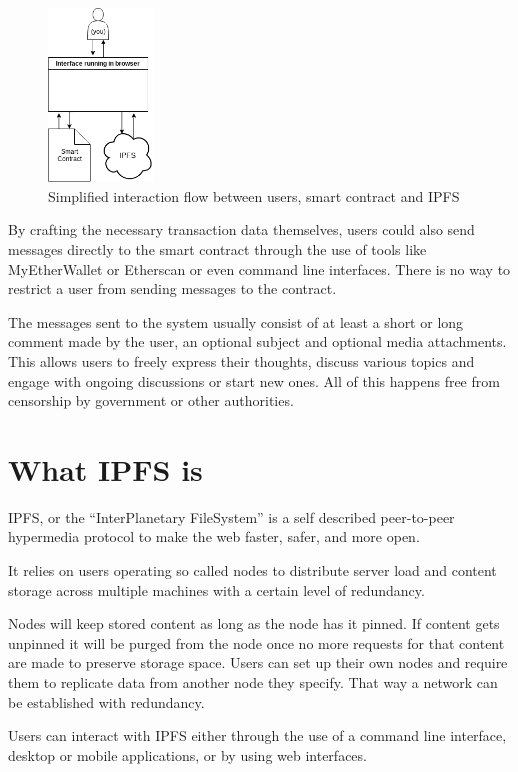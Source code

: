 \documentclass[a4paper]{article}
\begin{document}
\begin{figure}[H]
  \centering
  \includegraphics[width=0.25\textwidth]{0x_flow.png}
  \caption{Simplified interaction flow between users, smart contract and IPFS}
  \label{fig:flow}
\end{figure}

By crafting the necessary transaction data themselves, users could also send messages directly to the smart contract through the use of tools like MyEtherWallet or Etherscan or even command line interfaces. There is no way to restrict a user from sending messages to the contract.

The messages sent to the system usually consist of at least a short or long comment made by the user, an optional subject and optional media attachments. This allows users to freely express their thoughts, discuss various topics and engage with ongoing discussions or start new ones. All of this happens free from censorship by government or other authorities.

\section{What IPFS is}
IPFS, or the ``InterPlanetary FileSystem'' is a self described peer-to-peer hypermedia protocol to make the web faster, safer, and more open.

It relies on users operating so called nodes to distribute server load and content storage across multiple machines with a certain level of redundancy.

Nodes will keep stored content as long as the node has it pinned. If content gets unpinned it will be purged from the node once no more requests for that content are made to preserve storage space. Users can set up their own nodes and require them to replicate data from another node they specify. That way a network can be established with redundancy.

Users can interact with IPFS either through the use of a command line interface, desktop or mobile applications, or by using web interfaces.
\end{document}
